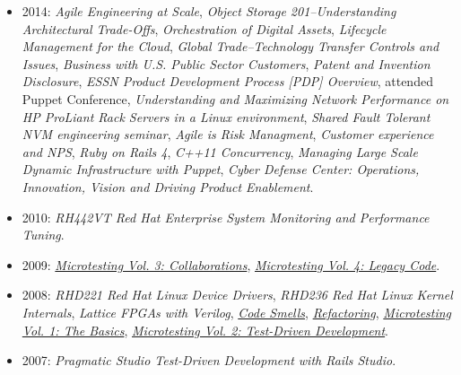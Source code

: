 \documentclass[10pt,letterpaper,oneside]{report}
\begin{document}
\begin{itemize}
  \item 2014:
    \textit{Agile Engineering at Scale},
    \textit{Object Storage 201--Understanding Architectural Trade-Offs},
    \textit{Orchestration of Digital Assets},
    \textit{Lifecycle Management for the Cloud},
    \textit{Global Trade--Technology Transfer Controls and Issues},
    \textit{Business with U.S. Public Sector Customers},
    \textit{Patent and Invention Disclosure},
    \textit{ESSN Product Development Process [PDP] Overview},
    attended Puppet Conference,
    \textit{Understanding and Maximizing Network Performance on HP ProLiant Rack
      Servers in a Linux environment},
    \textit{Shared Fault Tolerant NVM engineering seminar},
    \textit{Agile is Risk Managment},
    \textit{Customer experience and NPS},
    \textit{Ruby on Rails 4},
    \textit{C++11 Concurrency},
    \textit{Managing Large Scale Dynamic Infrastructure with Puppet},
    \textit{Cyber Defense Center: Operations, Innovation, Vision and Driving
      Product Enablement}.

  \item 2010:
    \textit{RH442VT Red Hat Enterprise System Monitoring and Performance Tuning}.

  \item 2009:
    \href{https://elearning.industriallogic.com/gh/submit?Action=AlbumContentsAction&album=collaborations&devLanguage=Cpp}
      {\textit{Microtesting Vol. 3: Collaborations}},
    \href{https://elearning.industriallogic.com/gh/submit?Action=AlbumContentsAction&album=legacy&devLanguage=Cpp}
      {\textit{Microtesting Vol. 4: Legacy Code}}.

  \item 2008:
    \textit{RHD221 Red Hat Linux Device Drivers},
    \textit{RHD236 Red Hat Linux Kernel Internals},
    \textit{Lattice FPGAs with Verilog},
    \href{https://elearning.industriallogic.com/gh/submit?Action=AlbumContentsAction&album=recognizingSmells&devLanguage=Cpp}
      {\textit{Code Smells}},
    \href{https://elearning.industriallogic.com/gh/submit?Action=AlbumContentsAction&album=foundations&devLanguage=Cpp}
      {\textit{Refactoring}},
    \href{https://elearning.industriallogic.com/gh/submit?Action=AlbumContentsAction&album=theBasics&devLanguage=Cpp}
      {\textit{Microtesting Vol. 1: The Basics}},
    \href{https://elearning.industriallogic.com/gh/submit?Action=AlbumContentsAction&album=before&devLanguage=Cpp}
      {\textit{Microtesting Vol. 2: Test-Driven Development}}.

  \item 2007: \textit{Pragmatic Studio Test-Driven Development with Rails Studio}.


\end{itemize}
\end{document}
